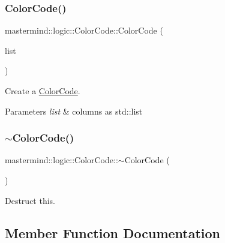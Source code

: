 \subsubsection{\texorpdfstring{Color\+Code()}{ColorCode()}\hspace{0.1cm}{\footnotesize\ttfamily [3/3]}}
{\footnotesize\ttfamily mastermind\+::logic\+::\+Color\+Code\+::\+Color\+Code (\begin{DoxyParamCaption}\item[{std\+::list$<$ int $>$ \&}]{list }\end{DoxyParamCaption})}



Create a \hyperlink{classmastermind_1_1logic_1_1_color_code}{Color\+Code}. 


\begin{DoxyParams}{Parameters}
{\em list} & columns as std\+::list \\
\hline
\end{DoxyParams}
\hypertarget{classmastermind_1_1logic_1_1_color_code_aee5e4a3d13fd9e2e2c69964fdffe04cf}{}\label{classmastermind_1_1logic_1_1_color_code_aee5e4a3d13fd9e2e2c69964fdffe04cf} 
\subsubsection{\texorpdfstring{$\sim$\+Color\+Code()}{~ColorCode()}}
{\footnotesize\ttfamily mastermind\+::logic\+::\+Color\+Code\+::$\sim$\+Color\+Code (\begin{DoxyParamCaption}{ }\end{DoxyParamCaption})}



Destruct this. 



\subsection{Member Function Documentation}
\hypertarget{classmastermind_1_1logic_1_1_color_code_a095c8e37b19f67c219ac674cc0948d41}{}\label{classmastermind_1_1logic_1_1_color_code_a095c8e37b19f67c219ac674cc0948d41} 
